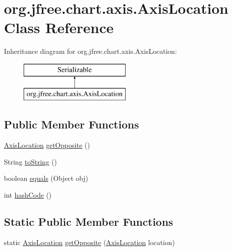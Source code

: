 \hypertarget{classorg_1_1jfree_1_1chart_1_1axis_1_1_axis_location}{}\section{org.\+jfree.\+chart.\+axis.\+Axis\+Location Class Reference}
\label{classorg_1_1jfree_1_1chart_1_1axis_1_1_axis_location}
Inheritance diagram for org.\+jfree.\+chart.\+axis.\+Axis\+Location\+:\begin{figure}[H]
\begin{center}
\leavevmode
\includegraphics[height=2.000000cm]{classorg_1_1jfree_1_1chart_1_1axis_1_1_axis_location}
\end{center}
\end{figure}
\subsection*{Public Member Functions}
\begin{DoxyCompactItemize}
\item 
\mbox{\hyperlink{classorg_1_1jfree_1_1chart_1_1axis_1_1_axis_location}{Axis\+Location}} \mbox{\hyperlink{classorg_1_1jfree_1_1chart_1_1axis_1_1_axis_location_a34224152494bee323f19223c95c98430}{get\+Opposite}} ()
\item 
String \mbox{\hyperlink{classorg_1_1jfree_1_1chart_1_1axis_1_1_axis_location_a805f57ad4431115e866583d9af029f15}{to\+String}} ()
\item 
boolean \mbox{\hyperlink{classorg_1_1jfree_1_1chart_1_1axis_1_1_axis_location_ae6e2510d7a2eac2c26a9ecfe4e9aeaa3}{equals}} (Object obj)
\item 
int \mbox{\hyperlink{classorg_1_1jfree_1_1chart_1_1axis_1_1_axis_location_a25946032616bf206f21677db4fe28d8f}{hash\+Code}} ()
\end{DoxyCompactItemize}
\subsection*{Static Public Member Functions}
\begin{DoxyCompactItemize}
\item 
static \mbox{\hyperlink{classorg_1_1jfree_1_1chart_1_1axis_1_1_axis_location}{Axis\+Location}} \mbox{\hyperlink{classorg_1_1jfree_1_1chart_1_1axis_1_1_axis_location_a44a0442ba04676a3bf899f804cae0600}{get\+Opposite}} (\mbox{\hyperlink{classorg_1_1jfree_1_1chart_1_1axis_1_1_axis_location}{Axis\+Location}} location)
\end{DoxyCompactItemize}
